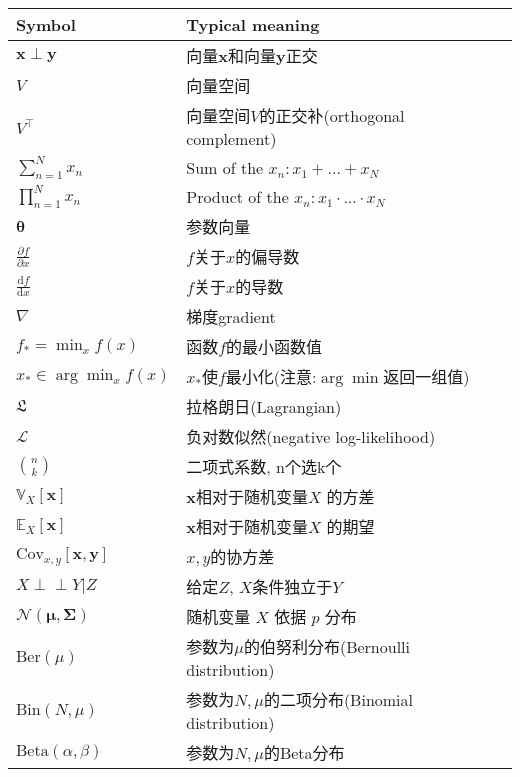 \begin{table}
\begin{tabular}{llp{\textwidth}}
	\hline
	Symbol & Typical meaning \\
	\hline
	\hline
	$ \boldsymbol{x} \perp \boldsymbol{y} $ & 向量$\boldsymbol{x}$和向量$\boldsymbol{y}$正交 \\
	$V$ & 向量空间 \\
	$V^\top$ & 向量空间$V$的正交补(orthogonal complement) \\
	$\sum_{n=1}^{N}x_n$ & Sum of the $x_n: x_1 + ... + x_N$ \\
	$\prod_{n=1}^{N}x_n$ & Product of the $x_n: x_1 \cdot ... \cdot x_N$ \\
	$\boldsymbol{\theta}$ & 参数向量 \\
	$ \frac{\partial f}{\partial x} $ & $f$关于$x$的偏导数 \\
	$ \frac{\mathrm{d} f}{\mathrm{d} x} $ & $f$关于$x$的导数 \\
	$ \nabla $ & 梯度{gradient} \\
	$ f_* = \min_x f(x) $ & 函数$f$的最小函数值 \\
	$ x_* \in \arg \min_x f(x) $ & $x_*$使$f$最小化(注意:$\arg \min$返回一组值) \\ 
	$ \mathfrak{L}$ & 拉格朗日(Lagrangian) \\
	$ \mathcal{L}$ & 负对数似然(negative log-likelihood) \\
	$\binom{n}{k}$ & 二项式系数, n个选k个\\
	$\mathbb{V}_X[\boldsymbol{x}]$ & $\boldsymbol{x}$相对于随机变量$X$ 的方差 \\
	$\mathbb{E}_X[\boldsymbol{x}]$ & $\boldsymbol{x}$相对于随机变量$X$ 的期望 \\
	$\mathrm{Cov}_{x,y}[\boldsymbol{x}, \boldsymbol{y}]$ & $x,y$的协方差 \\
	$X \perp \!\!\! \perp Y | Z$ & 给定$Z$, $X$条件独立于$Y$ \\
	$\mathcal{N}(\boldsymbol{\mu}, \boldsymbol{\Sigma})$ & 随机变量 $X$ 依据 $p$ 分布 \\
	$\mathrm{Ber}(\mu)$ & 参数为$\mu$的伯努利分布(Bernoulli distribution) \\
	$\mathrm{Bin}(N, \mu)$ & 参数为$N, \mu$的二项分布(Binomial distribution) \\
	$\mathrm{Beta}(\alpha, \beta)$ & 参数为$N, \mu$的Beta分布 \\
	\hline
\end{tabular}
\end{table}

